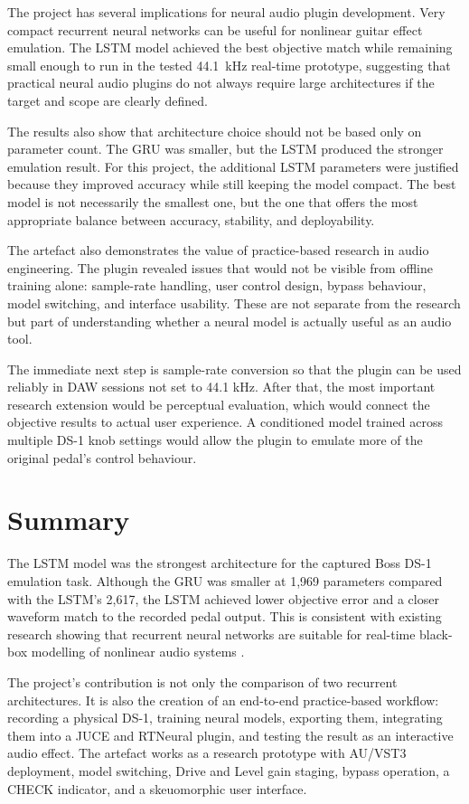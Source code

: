 The project has several implications for neural audio plugin development. Very compact recurrent neural networks can be useful for nonlinear guitar effect emulation. The LSTM model achieved the best objective match while remaining small enough to run in the tested 44.1~kHz real-time prototype, suggesting that practical neural audio plugins do not always require large architectures if the target and scope are clearly defined.

The results also show that architecture choice should not be based only on parameter count. The GRU was smaller, but the LSTM produced the stronger emulation result. For this project, the additional LSTM parameters were justified because they improved accuracy while still keeping the model compact. The best model is not necessarily the smallest one, but the one that offers the most appropriate balance between accuracy, stability, and deployability.

The artefact also demonstrates the value of practice-based research in audio engineering. The plugin revealed issues that would not be visible from offline training alone: sample-rate handling, user control design, bypass behaviour, model switching, and interface usability. These are not separate from the research but part of understanding whether a neural model is actually useful as an audio tool.

The immediate next step is sample-rate conversion so that the plugin can be used reliably in DAW sessions not set to 44.1 kHz. After that, the most important research extension would be perceptual evaluation, which would connect the objective results to actual user experience. A conditioned model trained across multiple DS-1 knob settings would allow the plugin to emulate more of the original pedal's control behaviour.

\section{Summary}

The LSTM model was the strongest architecture for the captured Boss DS-1 emulation task. Although the GRU was smaller at 1,969 parameters compared with the LSTM's 2,617, the LSTM achieved lower objective error and a closer waveform match to the recorded pedal output. This is consistent with existing research showing that recurrent neural networks are suitable for real-time black-box modelling of nonlinear audio systems \cite{wright_real-time_2019}.

The project's contribution is not only the comparison of two recurrent architectures. It is also the creation of an end-to-end practice-based workflow: recording a physical DS-1, training neural models, exporting them, integrating them into a JUCE and RTNeural plugin, and testing the result as an interactive audio effect. The artefact works as a research prototype with AU/VST3 deployment, model switching, Drive and Level gain staging, bypass operation, a CHECK indicator, and a skeuomorphic user interface.

